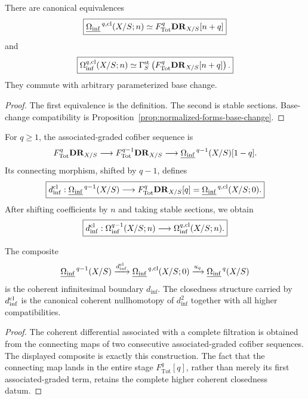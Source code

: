 \begin{theorem}
\label{thm:closed-forms-hodge-tail}
There are canonical equivalences
\[
\boxed{
    \underline{\Omega_{\mathrm{inf}}}^{\,q,\mathrm{cl}}(X/S;n)
    \simeq
    F_{\mathrm{Tot}}^q\mathbf{DR}_{X/S}[n+q]
}
\]
and
\[
\boxed{
    \Omega_{\mathrm{inf}}^{q,\mathrm{cl}}(X/S;n)
    \simeq
    \Gamma_S^{\mathrm{st}}
    \left(
        F_{\mathrm{Tot}}^q\mathbf{DR}_{X/S}[n+q]
    \right).
}
\]
They commute with arbitrary parameterized base change.
\end{theorem}

\begin{proof}
The first equivalence is the definition.  The second is stable sections.  Base-change compatibility
is Proposition~\ref{prop:normalized-forms-base-change}.
\end{proof}

\begin{construction}
\label{constr:exact-form-classifier}
For \(q\geq1\), the associated-graded cofiber sequence is
\[
    F_{\mathrm{Tot}}^q\mathbf{DR}_{X/S}
    \longrightarrow
    F_{\mathrm{Tot}}^{q-1}\mathbf{DR}_{X/S}
    \longrightarrow
    \underline{\Omega_{\mathrm{inf}}}^{\,q-1}(X/S)[1-q].
\]
Its connecting morphism, shifted by \(q-1\), defines
\[
\boxed{
    d_{\inf}^{\mathrm{cl}}:
    \underline{\Omega_{\mathrm{inf}}}^{\,q-1}(X/S)
    \longrightarrow
    F_{\mathrm{Tot}}^q\mathbf{DR}_{X/S}[q]
    =
    \underline{\Omega_{\mathrm{inf}}}^{\,q,\mathrm{cl}}(X/S;0).
}
\]
After shifting coefficients by \(n\) and taking stable sections, we obtain
\[
\boxed{
    d_{\inf}^{\mathrm{cl}}:
    \Omega_{\mathrm{inf}}^{q-1}(X/S;n)
    \longrightarrow
    \Omega_{\mathrm{inf}}^{q,\mathrm{cl}}(X/S;n).
}
\]
\end{construction}

\begin{proposition}
\label{prop:exact-form-underlying-boundary}
The composite
\[
    \underline{\Omega_{\mathrm{inf}}}^{\,q-1}(X/S)
    \xrightarrow{d_{\inf}^{\mathrm{cl}}}
    \underline{\Omega_{\mathrm{inf}}}^{\,q,\mathrm{cl}}(X/S;0)
    \xrightarrow{u_q}
    \underline{\Omega_{\mathrm{inf}}}^{\,q}(X/S)
\]
is the coherent infinitesimal boundary \(d_{\inf}\).  The closedness structure carried by
\(d_{\inf}^{\mathrm{cl}}\) is the canonical coherent nullhomotopy of \(d_{\inf}^2\) together with all higher
compatibilities.
\end{proposition}

\begin{proof}
The coherent differential associated with a complete filtration is obtained from the connecting maps
of two consecutive associated-graded cofiber sequences.  The displayed composite is exactly this
construction.  The fact that the connecting map lands in the entire stage
\(F_{\mathrm{Tot}}^q[q]\), rather than merely its first associated-graded term, retains the complete higher
coherent closedness datum.
\end{proof}

